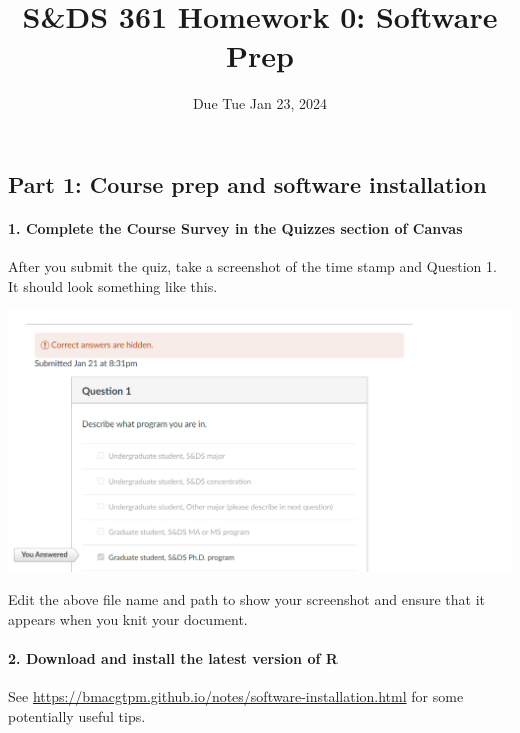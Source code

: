\documentclass[
]{article}
\title{S\&DS 361 Homework 0: Software Prep}
\author{}
\date{\vspace{-2.5em}Due Tue Jan 23, 2024}
\begin{document}
\maketitle

\hypertarget{part-1-course-prep-and-software-installation}{%
\subsection{Part 1: Course prep and software
installation}\label{part-1-course-prep-and-software-installation}}

\hypertarget{complete-the-course-survey-in-the-quizzes-section-of-canvas}{%
\paragraph{1. Complete the Course Survey in the Quizzes section of
Canvas}\label{complete-the-course-survey-in-the-quizzes-section-of-canvas}}

After you submit the quiz, take a screenshot of the time stamp and
Question 1. It should look something like this.

\includegraphics{img/Screenshot 2024-01-21 203344.png}

Edit the above file name and path to show your screenshot and ensure
that it appears when you knit your document.

\hypertarget{download-and-install-the-latest-version-of-r}{%
\paragraph{2. Download and install the latest version of
R}\label{download-and-install-the-latest-version-of-r}}

See \url{https://bmacgtpm.github.io/notes/software-installation.html}
for some potentially useful tips.
\end{document}
